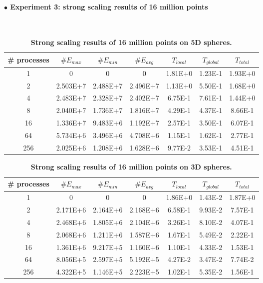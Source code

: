 \documentclass[12pt]{article}
\begin{document}
\paragraph{$\bullet$ \large{ Experiment 3: strong scaling results of 16 million points}}
$ $\newline
\renewcommand{\arraystretch}{1.7}
\begin{table}[h]
\centering
    \caption{\textbf{Strong scaling results of 16 million points on 5D spheres.} }
	\label{16M5D}
\begin{tabular}{ccccccc}
    \hline %
\# processes  &$\# E_{max}$   &$\# E_{min}$ &$\# E_{avg}$  &$T_{local}$  &$T_{global}$  &$T_{total}$\\
\hline\hline
1 &0 &0 &0 &1.81E+0    &1.23E-1    &1.93E+0\\
2  &2.503E+7   &2.488E+7   &2.496E+7 &1.13E+0   &5.50E-1    &1.68E+0\\
4  &2.483E+7   &2.328E+7   &2.402E+7 &6.75E-1   &7.61E-1    &1.44E+0\\
8  &2.040E+7   &1.736E+7   &1.816E+7 &4.29E-1   &4.37E-1    &8.66E-1\\
16  &1.336E+7   &9.483E+6   &1.192E+7 &2.57E-1  &3.50E-1    &6.07E-1\\
64  &5.734E+6   &3.496E+6   &4.708E+6 &1.15E-1  &1.62E-1    &2.77E-1\\
256  &2.025E+6   &1.208E+6   &1.628E+6 &9.77E-2 &3.53E-1    &4.51E-1\\
\hline
    \end{tabular}
\end{table}
\renewcommand{\arraystretch}{1.7}
\begin{table}[h]
\centering
    \caption{\textbf{Strong scaling results of 16 million points on 3D spheres.} }
	\label{16M3D}
\begin{tabular}{ccccccc}
    \hline %
\# processes  &$\# E_{max}$   &$\# E_{min}$ &$\# E_{avg}$  &$T_{local}$  &$T_{global}$  &$T_{total}$\\
\hline\hline
1 &0 &0 &0 &1.86E+0 &1.43E-2   &1.87E+0\\
2  &2.171E+6   &2.164E+6   &2.168E+6 &6.58E-1 &9.93E-2  &7.57E-1\\
4   &2.468E+6   &1.805E+6   &2.104E+6 &3.26E-1 &8.10E-2 &4.07E-1\\
8  &2.068E+6   &1.211E+6   &1.587E+6 &1.67E-1 &5.49E-2  &2.22E-1\\
16  &1.361E+6   &9.217E+5   &1.160E+6 &1.10E-1 &4.33E-2 &1.53E-1\\
64  &8.056E+5   &2.597E+5   &5.192E+5 &4.27E-2 &3.47E-2 &7.74E-2\\
256  &4.322E+5   &1.146E+5   &2.223E+5 &1.02E-1 &5.35E-2    &1.56E-1\\
\hline
    \end{tabular}
\end{table}
\end{document}
